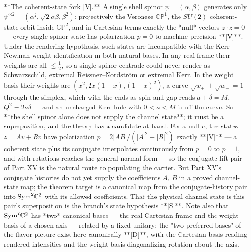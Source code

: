 **The coherent-state fork [V].** A single shell spinor $\psi = (\alpha,\beta)$ generates only $\psi^{\odot2} = (\alpha^2,\sqrt2\alpha\beta,\beta^2)$: projectively the Veronese $\mathbb{CP}^1$, the $SU(2)$ coherent-state orbit inside $\mathbb{CP}^2$, and in Cartesian terms exactly the *null* vectors $z\cdot z = 0$ — every single-spinor state has polarization $p = 0$ to machine precision **[V]**. Under the rendering hypothesis, such states are incompatible with the Kerr–Newman weight identification in both natural bases. In any real frame their weights are all $\leq\tfrac12$, so a single-spinor centrade could never render as Schwarzschild, extremal Reissner–Nordström or extremal Kerr. In the weight basis their weights are $(x^2,2x(1-x),(1-x)^2)$, a curve $\sqrt{w_+}+\sqrt{w_-} = 1$ through the simplex, which with the ends as spin and gap reads $a+\delta = M$, $Q^2 = 2a\delta$ — and an uncharged Kerr hole with $0<a<M$ is off the curve. So **the shell spinor alone does not supply the channel state**; it must be a superposition, and the theory has a candidate at hand. For a null $v$, the states $z = Av+B\bar v$ have polarization $p = 2|AB|/(|A|^2+|B|^2)$ exactly **[V]** — a coherent state plus its conjugate interpolates continuously from $p = 0$ to $p = 1$, and with rotations reaches the general normal form — so the conjugate-lift pair of Part XV is the natural route to populating the carrier. But Part XV's conjugate histories do not yet supply the coefficients $A$, $B$ in a proved channel-state map; the theorem target is a canonical map from the conjugate-history pair into ${\rm Sym}^2\mathbb C^2$ with its allowed coefficients. That the physical channel state is this pair's superposition is the branch's state hypothesis **[S]**. Note also that ${\rm Sym}^2\mathbb C^2$ has *two* canonical bases — the real Cartesian frame and the weight basis of a chosen axis — related by a fixed unitary: the "two preferred bases" of the flavor picture exist here canonically **[D]**, with the Cartesian basis reading rendered intensities and the weight basis diagonalizing rotation about the axis.


